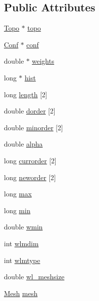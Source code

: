 \subsection*{Public Attributes}
\begin{DoxyCompactItemize}
\item 
\hyperlink{struct_topo}{Topo} $\ast$ \hyperlink{class_wang_landau_a501fc7de450a2e78e5817331ec748517}{topo}
\item 
\hyperlink{class_conf}{Conf} $\ast$ \hyperlink{class_wang_landau_acffd727c52c62ecf4bb12afbef005f91}{conf}
\item 
double $\ast$ \hyperlink{class_wang_landau_ad496dccf54ec8d44362b51e4e9df6a0a}{weights}
\item 
long $\ast$ \hyperlink{class_wang_landau_aeec23524069d5194edccbe4a62337b49}{hist}
\item 
long \hyperlink{class_wang_landau_a252b732514b252e242214c9af3d5a462}{length} \mbox{[}2\mbox{]}
\item 
double \hyperlink{class_wang_landau_afaa523a1ec9e61fcb7045fafd2612482}{dorder} \mbox{[}2\mbox{]}
\item 
double \hyperlink{class_wang_landau_a8e8133ccc74e6d1c04d1cabc6ec7f75b}{minorder} \mbox{[}2\mbox{]}
\item 
double \hyperlink{class_wang_landau_a8bb1140ae96416553fe3c286e33446fa}{alpha}
\item 
long \hyperlink{class_wang_landau_a1d6cf967b7c33ff4140109e17df8c842}{currorder} \mbox{[}2\mbox{]}
\item 
long \hyperlink{class_wang_landau_a0b32be956e40083026f9b8bb1021f30b}{neworder} \mbox{[}2\mbox{]}
\item 
long \hyperlink{class_wang_landau_ad2954970aa554f2ea0031d943eab9bb7}{max}
\item 
long \hyperlink{class_wang_landau_ab863f19bb4921b6f3cd4f9dbe062cef2}{min}
\item 
double \hyperlink{class_wang_landau_a322c81039b5e71972667d3fac00e2576}{wmin}
\item 
int \hyperlink{class_wang_landau_a7ad19ee80822168ea3ee712529f1b96d}{wlmdim}
\item 
int \hyperlink{class_wang_landau_ae307e86eafae0c11461c0beac5462868}{wlmtype}
\item 
double \hyperlink{class_wang_landau_ae8655cc00c6200de6523e4eef767d5ed}{wl\+\_\+meshsize}
\item 
\hyperlink{class_mesh}{Mesh} \hyperlink{class_wang_landau_a9ba65a2907470556cf8dae45ffdf9085}{mesh}
\item 

\end{DoxyCompactItemize}
